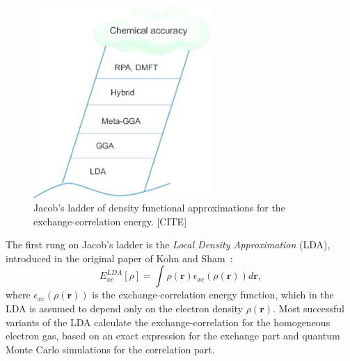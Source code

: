 \begin{refsection}
\begin{figure}
\centering
\includegraphics[width=0.6\textwidth]{./figures/DFT/jacob.png}
\caption{Jacob's ladder of density functional approximations for the exchange-correlation energy. [CITE]}
\label{fig:jacob}
\end{figure}

The first rung on Jacob's ladder is the \textit{Local Density Approximation} (LDA), introduced in the original paper of Kohn and Sham~\cite{Kohn1965}:
\begin{equation}
E_{xc}^{LDA}[\rho] = \int \rho(\mathbf{r}) \epsilon_{xc}(\rho(\mathbf{r}))d\mathbf{r},
\end{equation}
where $\epsilon_{xc}(\rho(\mathbf{r}))$ is the exchange-correlation energy function, which in the LDA is assumed to depend only on the electron density $\rho(\mathbf{r})$. Most successful variants of the LDA calculate the exchange-correlation for the homogeneous electron gas, based on an exact expression for the exchange part and quantum Monte Carlo simulations for the correlation part.


\end{refsection}
